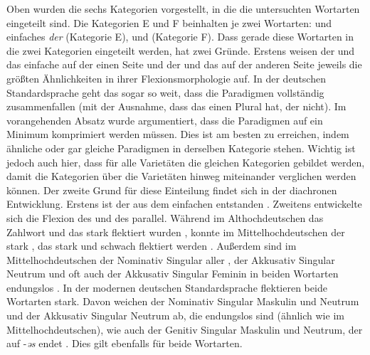 \begin{exe}
\begin{exe}
Oben wurden die sechs Kategorien vorgestellt, in die die untersuchten Wortarten eingeteilt sind. Die Kategorien E und F beinhalten je zwei Wortarten:  und einfaches  \textit{der} (Kategorie E),  und  (Kategorie F). Dass gerade diese Wortarten in die zwei Kategorien eingeteilt werden, hat zwei Gründe. Erstens weisen der  und das einfache  auf der einen Seite und der  und das  auf der anderen Seite jeweils die größten Ähnlichkeiten in ihrer Flexionsmorphologie auf. In der deutschen Standardsprache geht das sogar so weit, dass die Paradigmen vollständig zusammenfallen (mit der Ausnahme, dass das  einen Plural hat, der  nicht). Im vorangehenden Absatz wurde argumentiert, dass die Paradigmen auf ein Minimum komprimiert werden müssen. Dies ist am besten zu erreichen, indem ähnliche oder gar gleiche Paradigmen in derselben Kategorie stehen. Wichtig ist jedoch auch hier, dass für alle Varietäten die gleichen Kategorien gebildet werden, damit die Kategorien über die Varietäten hinweg miteinander verglichen werden können. Der zweite Grund für diese Einteilung findet sich in der diachronen Entwicklung. Erstens ist der  aus dem einfachen  entstanden \citep[23]{Schrodt2004}. Zweitens entwickelte sich die Flexion des  und des  parallel. Während im Althochdeutschen das Zahlwort und das  stark flektiert wurden \citep[234, 245]{Braune2004}, konnte im Mittelhochdeutschen der  stark \citep[217]{Paul2007}, das  stark und schwach flektiert werden \citep[216, 369]{Paul2007}. Außerdem sind im Mittelhochdeutschen der Nominativ Singular aller , der Akkusativ Singular Neutrum und oft auch der Akkusativ Singular Feminin in beiden Wortarten endungslos \citep[216-217]{Paul2007}. In der modernen deutschen Standardsprache flektieren beide Wortarten stark. Davon weichen der Nominativ Singular Maskulin und Neutrum und der Akkusativ Singular Neutrum ab, die endungslos sind (ähnlich wie im Mittelhochdeutschen), wie auch der Genitiv Singular Maskulin und Neutrum, der auf -\textit{əs} endet \citep[176]{Eisenberg2006}. Dies gilt ebenfalls für beide Wortarten.


\end{exe}
\end{exe}
